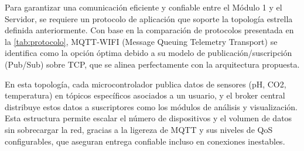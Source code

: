 Para garantizar una comunicación eficiente y confiable entre el Módulo 1  y el Servidor, 
se requiere un protocolo de aplicación que soporte la topología estrella definida anteriormente. 
Con base en la comparación de protocolos presentada en la \cref{tab:protocolo}, 
MQTT-WIFI (Message Queuing Telemetry Transport) se identifica como la opción óptima debido 
a su modelo de publicación/suscripción (Pub/Sub) sobre TCP, que se alinea perfectamente 
con la arquitectura propuesta.

En esta topología, cada microcontrolador publica datos de sensores (pH, CO2, temperatura) 
en tópicos específicos asociados a un usuario, y el broker central distribuye estos datos 
a suscriptores como los módulos de análisis y visualización. Esta estructura permite escalar 
el número de dispositivos y el volumen de datos sin sobrecargar la red, gracias a la ligereza 
de MQTT y sus niveles de QoS configurables, que aseguran entrega confiable incluso en conexiones inestables.

